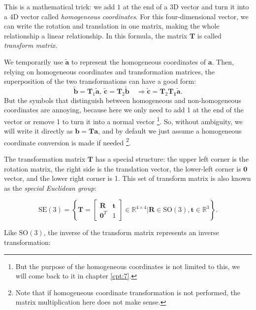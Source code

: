 This is a mathematical trick: we add $ 1 $ at the end of a 3D vector and turn it into a 4D vector called \textit{homogeneous coordinates}. For this four-dimensional vector, we can write the rotation and translation in one matrix, making the whole relationship a linear relationship. In this formula, the matrix $ \mathbf {T} $ is called \textit{transform matrix}.

We temporarily use $  \tilde { \mathbf {a} } $ to represent the homogeneous coordinates of $ \mathbf {a} $. Then, relying on homogeneous coordinates and transformation matrices, the superposition of the two transformations can have a good form:
\begin{equation}
\tilde{\mathbf{b}} = \mathbf{T}_1 \tilde{\mathbf{a}}, \  \tilde{\mathbf{c}} = \mathbf{T}_2 \tilde{\mathbf{b}} \quad \Rightarrow \tilde{\mathbf{c}} = \mathbf{T}_2 \mathbf{T_1} \tilde{\mathbf{a}}.
\end{equation}
But the symbols that distinguish between homogeneous and non-homogeneous coordinates are annoying, because here we only need to add 1 at the end of the vector or remove 1 to turn it into a normal vector \footnote {But the purpose of the homogeneous coordinates is not limited to this, we will come back to it in chapter \ref{cpt:7}.}. So, without ambiguity, we will write it directly as $ \mathbf {b}= \mathbf {T} \mathbf {a} $, and by default we just assume a homogeneous coordinate conversion is made if needed \footnote { Note that if homogeneous coordinate transformation is not performed, the matrix multiplication here does not make sense. }.

The transformation matrix $\mathbf{T}$ has a special structure: the upper left corner is the rotation matrix, the right side is the translation vector, the lower-left corner is $ \mathbf{0} $ vector, and the lower right corner is 1. This set of transform matrix is also known as the \textit{special Euclidean group}:

\begin{equation}
\mathrm{SE}(3) = \left\{ \mathbf{T} = \left[ {\begin{array}{*{20}{c}}
    \mathbf{R} & \mathbf{t} \\
    {{\mathbf{0}^T}} & 1
    \end{array}} \right]
\in \mathbb{R}^{4 \times 4} | \mathbf{R} \in \mathrm{SO}(3), \mathbf{t} \in \mathbb{R}^3\right\} .
\end{equation}

Like $ \mathrm{SO}( 3 ) $, the inverse of the transform matrix represents an inverse transformation:

